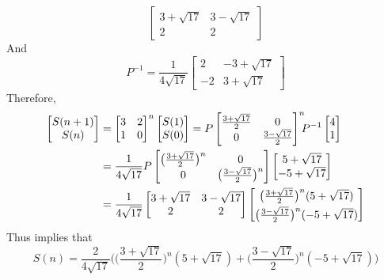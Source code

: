 \documentclass[12pt,a4paper]{article}
\begin{document}
\begin{enumerate}
\begin{enumerate}
\[\begin{bmatrix}
		3+\sqrt{17} & 3-\sqrt{17}\\
		2 & 2
		\end{bmatrix}
		\]
		And
		\[
		P^{-1}=\frac{1}{4\sqrt{17}}\begin{bmatrix}
		2 & -3+\sqrt{17}\\
		-2 & 3+\sqrt{17}
		\end{bmatrix}
		\]
		Therefore,
		\begin{align*}
		    \begin{bmatrix}
		    S(n+1)\\
		    S(n)
		    \end{bmatrix}&=\begin{bmatrix}
		    3 & 2\\
		    1 & 0
		    \end{bmatrix}^n\begin{bmatrix}
		    S(1)\\
		    S(0)
		    \end{bmatrix}=P\begin{bmatrix}
    		\frac{3+\sqrt{17}}{2} & 0\\
    		0 & \frac{3-\sqrt{17}}{2}
    		\end{bmatrix}^n\hspace{-5pt} P^{-1}\begin{bmatrix}
    		4\\
    		1
    		\end{bmatrix}\\
    		&=\frac{1}{4\sqrt{17}}P\begin{bmatrix}
    		\big(\frac{3+\sqrt{17}}{2}\big)^n & 0\\
    		0 & \big(\frac{3-\sqrt{17}}{2}\big)^n
    		\end{bmatrix}\begin{bmatrix}
    		5+\sqrt{17}\\
    		-5+\sqrt{17}
    		\end{bmatrix}\\
    		&=\frac{1}{4\sqrt{17}}\begin{bmatrix}
    		3+\sqrt{17} & 3-\sqrt{17}\\
    		2 & 2
    		\end{bmatrix}\begin{bmatrix}
    		\big(\frac{3+\sqrt{17}}{2}\big)^n(5+\sqrt{17})\\[3pt]
    		\big(\frac{3-\sqrt{17}}{2}\big)^n(-5+\sqrt{17})
    		\end{bmatrix}
		\end{align*}
		Thus implies that
		\[
		S(n)=\frac{2}{4\sqrt{17}}\bigg(\Big(\frac{3+\sqrt{17}}{2}\Big)^n(5+\sqrt{17})+\Big(\frac{3-\sqrt{17}}{2}\Big)^n(-5+\sqrt{17})\bigg)
\]
\end{enumerate}
\end{enumerate}
\end{document}
